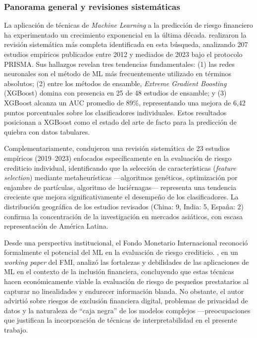 \documentclass[12pt, letterpaper]{article}
\begin{document}
\subsubsection{Panorama general y revisiones sistem\'aticas}

La aplicaci\'on de t\'ecnicas de \textit{Machine Learning} a la predicci\'on de riesgo financiero ha experimentado un crecimiento exponencial en la \'ultima d\'ecada. \citet{Dasilas2024} realizaron la revisi\'on sistem\'atica m\'as completa identificada en esta b\'usqueda, analizando 207 estudios emp\'iricos publicados entre 2012 y mediados de 2023 bajo el protocolo PRISMA. Sus hallazgos revelan tres tendencias fundamentales: (1) las redes neuronales son el m\'etodo de ML m\'as frecuentemente utilizado en t\'erminos absolutos; (2) entre los m\'etodos de ensamble, \textit{Extreme Gradient Boosting} (XGBoost) domina con presencia en 25 de 48 estudios de ensamble; y (3) XGBoost alcanza un AUC promedio de 89\%, representando una mejora de 6,42 puntos porcentuales sobre los clasificadores individuales. Estos resultados posicionan a XGBoost como el estado del arte de facto para la predicci\'on de quiebra con datos tabulares.

Complementariamente, \citet{Paz2025} condujeron una revisi\'on sistem\'atica de 23 estudios emp\'iricos (2019--2023) enfocados espec\'ificamente en la evaluaci\'on de riesgo crediticio individual, identificando que la selecci\'on de caracter\'isticas (\textit{feature selection}) mediante metaheur\'isticas ---algoritmos gen\'eticos, optimizaci\'on por enjambre de part\'iculas, algoritmo de luci\'ernagas--- representa una tendencia creciente que mejora significativamente el desempe\~no de los clasificadores. La distribuci\'on geogr\'afica de los estudios revisados (China: 9, India: 5, Espa\~na: 2) confirma la concentraci\'on de la investigaci\'on en mercados asi\'aticos, con escasa representaci\'on de Am\'erica Latina.

Desde una perspectiva institucional, el Fondo Monetario Internacional reconoci\'o formalmente el potencial del ML en la evaluaci\'on de riesgo crediticio. \citet{Bazarbash2019}, en un \textit{working paper} del FMI, analiz\'o las fortalezas y debilidades de las aplicaciones de ML en el contexto de la inclusi\'on financiera, concluyendo que estas t\'ecnicas hacen econ\'omicamente viable la evaluaci\'on de riesgo de peque\~nos prestatarios al capturar no linealidades y endurecer informaci\'on blanda. No obstante, el autor advirti\'o sobre riesgos de exclusi\'on financiera digital, problemas de privacidad de datos y la naturaleza de ``caja negra'' de los modelos complejos ---preocupaciones que justifican la incorporaci\'on de t\'ecnicas de interpretabilidad en el presente trabajo.
\end{document}

